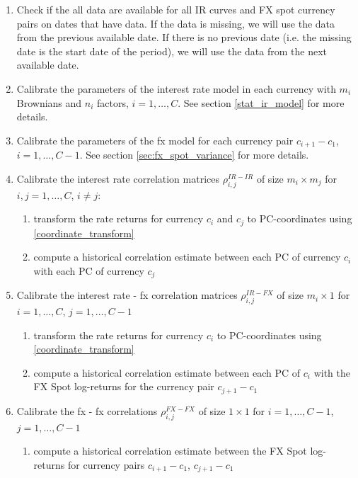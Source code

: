 \documentclass{amsart}
\theoremstyle{plain}
\numberwithin{equation}{section}
\begin{document}
\begin{enumerate}
\item Check if the all data are available for all IR curves and FX spot currency pairs on dates that have data. If the data is missing, we will use the data from the previous available date. If there is no previous date (i.e. the missing date is the start date of the period), we will use the data from the next available date.
\item Calibrate the parameters of the interest rate model in each currency with $m_i$ Brownians and $n_i$ factors, $i=1,\ldots,C$. See section \ref{stat_ir_model} for more details.
\item Calibrate the parameters of the fx model for each currency pair $c_{i+1} - c_1$, $i=1,\ldots,C-1$. See section \ref{sec:fx_spot_variance} for more details.
\item Calibrate the interest rate correlation matrices $\rho^{IR-IR}_{i,j}$ of size $m_i \times m_j$ for $i,j = 1,\ldots,C$, $i\neq j$:
  \begin{enumerate}
  \item transform the rate returns for currency $c_i$ and $c_j$ to PC-coordinates using \ref{coordinate_transform}
  \item compute a historical correlation estimate between each PC of currency $c_i$ with each PC of currency $c_j$
  \end{enumerate}
\item Calibrate the interest rate - fx correlation matrices $\rho^{IR-FX}_{i,j}$ of size $m_i \times 1$ for $i = 1,\ldots,C$, $j=1,\ldots,C-1$
  \begin{enumerate}
  \item transform the rate returns for currency $c_i$ to PC-coordinates using \ref{coordinate_transform}
  \item compute a historical correlation estimate between each PC of $c_i$ with the FX Spot log-returns for the currency pair $c_{j+1} - c_1$
  \end{enumerate}
\item Calibrate the fx - fx correlations $\rho^{FX-FX}_{i,j}$ of size $1 \times 1$ for $i = 1,\ldots,C-1$, $j=1,\ldots,C-1$
  \begin{enumerate}
  \item compute a historical correlation estimate between the FX Spot log-returns for currency pairs $c_{i+1} - c_1$, $c_{j+1} - c_1$
  \end{enumerate}
\end{enumerate}
\end{document}
